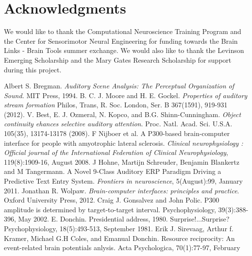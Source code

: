 \documentclass[10pt]{article}
\begin{document}
\section{Acknowledgments}
We would like to thank the Computational Neuroscience Training Program
and the Center for Sensorimotor Neural Engineering for funding towards
the Brain Links - Brain Tools summer exchange. We would also like to
thank the Levinson Emerging Scholarship and the Mary Gates Research
Scholarship for support during this project.

\begin{spacing}{.865}
\footnotesize{


\begin{thebibliography}{99}
     Albert S. Bregman. \emph{Auditory
        Scene Analysis: The Perceptual Organization of
        Sound.}  MIT Press, 1994.
     B. C. J. Moore and H. E. Gockel.
        \emph{Properties of auditory stream formation} Philos,
        Trans, R. Soc. London, Ser. B 367(1591), 919-931 (2012).
     V. Best, E. J. Ozmeral, N. Kopco, and
        B.G. Shinn-Cunningham. \emph{Object continuity ehances
        selective auditory attention}. Proc. Natl. Acad. Sci.
        U.S.A. 105(35), 13174-13178 (2008).
     F Nijboer et al. A P300-based
        brain-computer interface for people with amyotrophic
        lateral sclerosis. \emph{Clinical neurophysiology :
        Official journal of the International Federation of
        Clinical Neurophysiology}, 119(8):1909-16, August
            2008.
     J Hohne, Martijn Schreuder, Benjamin
        Blankertz and M Tangermann. A Novel 9-Class Auditory
        ERP Paradigm Driving a Predictive Text Entry System.
        \emph{Frontiers in neuroscience}, 5(August):99,
        January 2011.
     Jonathan R. Wolpaw.
        \emph{Brain-computer interfaces: principles and
        practice}.  Oxford University Press, 2012.
     Craig J. Gonsalvez and John Polic.
        P300 amplitude is determined by target-to-target
        interval.  Psychophysiology, 39(3):388-396, May 2002.
     E. Donchin.  Presidential address,
        1980. Surprise!...Surprise? Psychophysiology,
        18(5):493-513, September 1981.
     Erik J. Sirevaag, Arthur f. Kramer,
        Michael G.H Coles, and Emanual Donchin.  Resource
        reciprocity: An event-related brain potentials
        anlysis. Acta Psychologica, 70(1):77-97, February

\end{thebibliography}}
\end{spacing}
\end{document}
